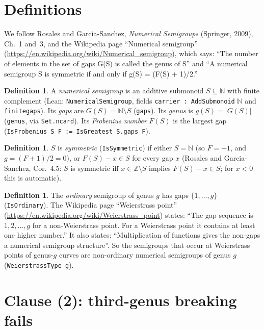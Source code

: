 \documentclass[11pt]{article}
\theoremstyle{definition}
\newtheorem{definition}[theorem]{Definition}
\theoremstyle{remark}
\renewcommand{\_}{\oldus\allowbreak}
\begin{document}
\section{Definitions}

We follow Rosales and Garcia-Sanchez, \emph{Numerical Semigroups} (Springer, 2009), Ch.~1 and~3, and the
Wikipedia page ``Numerical semigroup'' (\url{https://en.wikipedia.org/wiki/Numerical_semigroup}), which says:
``The number of elements in the set of gaps G(S) is called the genus of S'' and ``A numerical semigroup S is
symmetric if and only if g(S) = (F(S) + 1)/2.''

\begin{definition}
A \emph{numerical semigroup} is an additive submonoid $S \subseteq \mathbb{N}$ with finite complement (Lean:
\texttt{NumericalSemigroup}, fields \texttt{carrier : AddSubmonoid} $\mathbb{N}$ and \texttt{finite\_gaps}).
Its \emph{gaps} are $G(S) = \mathbb{N}\setminus S$ (\texttt{gaps}). Its \emph{genus} is $g(S) = |G(S)|$
(\texttt{genus}, via \texttt{Set.ncard}). Its \emph{Frobenius number} $F(S)$ is the largest gap
(\texttt{IsFrobenius S F := IsGreatest S.gaps F}).
\end{definition}

\begin{definition}
$S$ is \emph{symmetric} (\texttt{IsSymmetric}) if either $S = \mathbb{N}$ (so $F = -1$, and
$g = (F+1)/2 = 0$), or $F(S) - x \in S$ for every gap $x$ (Rosales and Garcia-Sanchez, Cor.~4.5: $S$ is
symmetric iff $x \in \mathbb{Z}\setminus S$ implies $F(S) - x \in S$; for $x<0$ this is automatic).
\end{definition}

\begin{definition}
The \emph{ordinary} semigroup of genus $g$ has gaps $\{1, \dots, g\}$ (\texttt{IsOrdinary}). The Wikipedia
page ``Weierstrass point'' (\url{https://en.wikipedia.org/wiki/Weierstrass_point}) states:
``The gap sequence is $1, 2, \dots, g$ for a non-Weierstrass point. For a Weierstrass point it contains at
least one higher number.'' It also states: ``Multiplication of functions gives the non-gaps a numerical
semigroup structure''. So the semigroups that occur at Weierstrass points of genus-$g$ curves are
non-ordinary numerical semigroups of genus $g$ (\texttt{WeierstrassType g}).
\end{definition}

\section{Clause (2): third-genus breaking fails}
\end{document}
